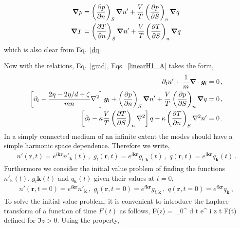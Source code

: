 \begin{align}\label{grad}
\bm{\nabla} p &= \left( \frac{\partial p}{\partial n} \right)_S \bm{\nabla} n' + \frac{V}{T} \left( \frac{\partial p}{\partial S} \right)_n \bm{\nabla} q
\notag \\
\bm{\nabla} T &= \left( \frac{\partial T}{\partial n} \right)_S \bm{\nabla} n' + \frac{V}{T} \left( \frac{\partial T}{\partial S} \right)_n \bm{\nabla} q\, 
\end{align} 
which is also clear from Eq.~\eqref{dq}.

Now with the relations, Eq.~\eqref{grad}, Eqs.~\eqref{linearH1_A} takes the form, 
\begin{align}\label{linearH1_B}
\partial_t n' + \frac{1}{m} \bm{\nabla} \cdot \bm{g}_l =0\, ,
\notag \\
\left[ \partial_t    -\frac{2\eta -2\eta / d + \zeta}{ mn } \nabla^2 \right]  \bm{g}_l 
+ \left( \frac{\partial p}{\partial n} \right)_S \bm{\nabla} n' + \frac{V}{T} \left( \frac{\partial p}{\partial S} \right)_n \bm{\nabla} q
=0\, ,
\notag \\
\left[ \partial_t - \kappa \frac{V}{T} \left( \frac{\partial T}{\partial S} \right)_n \nabla^2 \right] q - \kappa  \left( \frac{\partial T}{\partial n} \right)_S \nabla^2 n' =0\, .
\end{align}
In a simply connected medium of an infinite extent the modes should have a simple harmonic space dependence.
Therefore we write, 
\begin{align}\label{init0}
n'(\bm{r},t) = e^{ i \bm{k}\bm{r} } n'_{\bm{k}}(t)\, , \, \,
g_l(\bm{r},t) = e^{ i \bm{k}\bm{r} } g_{l,\bm{k}}(t)\, , \, \,
q(\bm{r},t) = e^{ i \bm{k}\bm{r} } q_{\bm{k}}(t)\, .
\end{align}
Furthermore we consider the initial value problem of finding the functions 
$n'_{\bm{k}}(t)$, $g_l{\bm{k}}(t)$ and $q_{\bm{k}}(t)$ given their values at $t=0$,
%
\begin{align}\label{init}
n'(\bm{r},t=0) = e^{ i \bm{k}\bm{r} } n'_{\bm{k}}\, , \, \,
g_l(\bm{r},t=0) = e^{ i \bm{k}\bm{r} } g_{l,\bm{k}}\, , \, \,
q(\bm{r},t=0) = e^{ i \bm{k}\bm{r} } q_{\bm{k}}\, ,
\end{align}
To solve the initial value problem, it is convenient to introduce the Laplace transform of a function of time $F(t)$
as follows,
\be\label{Laplace}
F(z) = \int_0^{\infty} d t e^{ i z t} F(t) 
\ee
defined for $\Im z > 0$.
Using the property,
